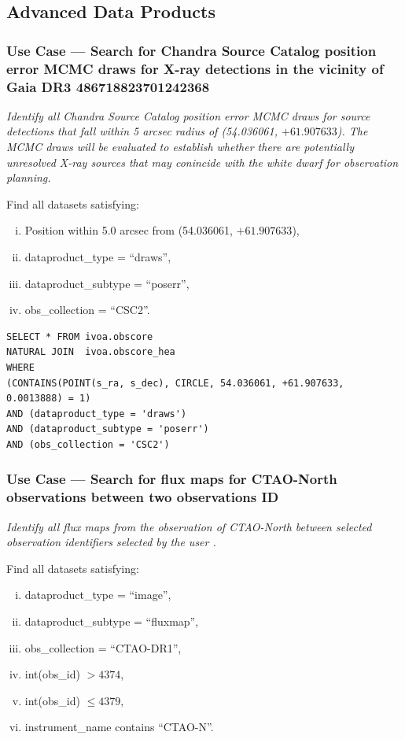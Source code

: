 \subsection{Advanced Data Products}

\subsubsection{Use Case --- Search for Chandra Source Catalog position error MCMC draws for X-ray detections in the vicinity of Gaia DR3 486718823701242368}

{\em Identify all Chandra Source Catalog position error MCMC draws for source detections that fall within 5 arcsec radius of  (54.036061, $+61.907633$).  The MCMC draws will be evaluated to establish whether there are potentially unresolved X-ray sources that may conincide with the white dwarf for observation planning.\/}

\medskip
\noindent Find all datasets satisfying:
\begin{enumerate}[(i)]
  \item Position within 5.0 arcsec from (54.036061, $+61.907633$),
  \item dataproduct\_type = ``draws'',
  \item dataproduct\_subtype = ``poserr'',
  \item obs\_collection = ``CSC2''.
\end{enumerate}

\begin{verbatim}
SELECT * FROM ivoa.obscore
NATURAL JOIN  ivoa.obscore_hea
WHERE
(CONTAINS(POINT(s_ra, s_dec), CIRCLE, 54.036061, +61.907633, 0.0013888) = 1)
AND (dataproduct_type = 'draws')
AND (dataproduct_subtype = 'poserr')
AND (obs_collection = 'CSC2')
\end{verbatim}


\subsubsection{Use Case --- Search for flux maps for CTAO-North observations between two observations ID}

{\em Identify all flux maps from the observation of CTAO-North between selected observation identifiers selected by the user .\/}

\medskip
\noindent Find all datasets satisfying:
\begin{enumerate}[(i)]
  \item dataproduct\_type = ``image'',
  \item dataproduct\_subtype = ``fluxmap'',
  \item obs\_collection = ``CTAO-DR1'',
  \item int(obs\_id) $> 4374$,
  \item int(obs\_id) $\leq 4379$,
  \item  instrument\_name contains ``CTAO-N''.
\end{enumerate}


